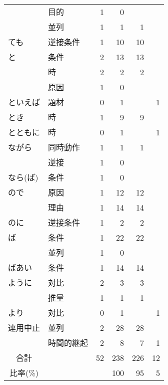 \begin{table}[htbp]
\begin{center}
\begin{tabular}{|l|l|r|r|r|r|}
               & 目的       &   1 &   0 &     &     \\
               & 並列       &   1 &   1 &   1 &     \\
      ても     & 逆接条件   &   1 &  10 &  10 &     \\
      と       & 条件       &   2 &  13 &  13 &     \\
               & 時         &   2 &   2 &   2 &     \\
               & 原因       &   1 &   0 &     &     \\
      といえば & 題材       &   0 &   1 &     &   1 \\
      とき     & 時         &   1 &   9 &   9 &     \\
      とともに & 時         &   0 &   1 &     &   1 \\
      ながら   & 同時動作   &   1 &   1 &   1 &     \\
               & 逆接       &   1 &   0 &     &     \\
      なら(ば) & 条件       &   1 &   0 &     &     \\
      ので     & 原因       &   1 &  12 &  12 &     \\
               & 理由       &   1 &  14 &  14 &     \\
      のに     & 逆接条件   &   1 &   2 &   2 &     \\
      ば       & 条件       &   1 &  22 &  22 &     \\
               & 並列       &   1 &   0 &     &     \\
      ばあい   & 条件       &   1 &  14 &  14 &     \\
      ように   & 対比       &   2 &   3 &   3 &     \\
               & 推量       &   1 &   1 &   1 &     \\
      より     & 対比       &   0 &   1 &     &   1 \\
      連用中止 & 並列       &   2 &  28 &  28 &     \\
               & 時間的継起 &   2 &   8 &   7 &   1 \\ \hline
      \multicolumn{1}{|c|}{合計} &
                            &  52 & 238 & 226 &  12 \\ \hline
      \multicolumn{1}{|c|}{比率(\%)} &
                            &     & 100 &  95 &   5 \\ \hline
    \end{tabular}
  \end{center}
\end{table}


